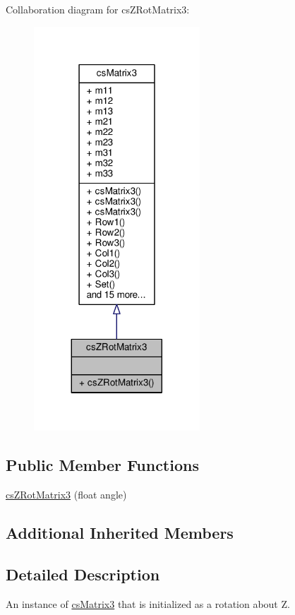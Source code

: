 Collaboration diagram for cs\+Z\+Rot\+Matrix3\+:
\nopagebreak
\begin{figure}[H]
\begin{center}
\leavevmode
\includegraphics[width=176pt]{d0/dfd/classcsZRotMatrix3__coll__graph}
\end{center}
\end{figure}
\subsection*{Public Member Functions}
\begin{DoxyCompactItemize}
\item 
\hyperlink{classcsZRotMatrix3_accd3335b6c57c7b48b3156dbc99df34b}{cs\+Z\+Rot\+Matrix3} (float angle)
\end{DoxyCompactItemize}
\subsection*{Additional Inherited Members}


\subsection{Detailed Description}
An instance of \hyperlink{classcsMatrix3}{cs\+Matrix3} that is initialized as a rotation about Z. 

